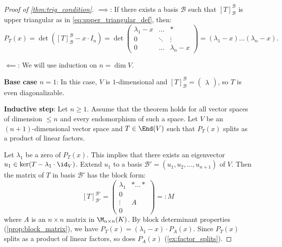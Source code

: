\begin{proof}[Proof of \cref{thm:trig_condition}]
  $\implies$: If there exists a basis $\mathcal{B}$ such that $[T]_{\mathcal{B}}^{\mathcal{B}}$ is upper triangular as in \eqref{eq:upper_triangular_def}, then:
  \[ P_T(x) = \det([T]_{\mathcal{B}}^{\mathcal{B}} - x \cdot I_n) = \det \begin{pmatrix} \lambda_1 - x & \dots & * \\ 0 & \ddots & \vdots \\ 0 & \dots & \lambda_n - x \end{pmatrix} = (\lambda_1 - x) \dots (\lambda_n - x). \]
  
  \noindent
  $\impliedby$: We will use induction on $n = \dim V$.

  \textbf{Base case $n=1$}: In this case, $V$ is $1$-dimensional and $[T]_{\mathcal{B}}^{\mathcal{B}} = \left(\begin{smallmatrix} \lambda \end{smallmatrix}\right)$, so $T$ is even diagonalizable.

  \textbf{Inductive step}: Let $n \ge 1$. Assume that the theorem holds for all vector spaces of dimension $\le n$ and every endomorphism of such a space.
  Let $V$ be an $(n+1)$-dimensional vector space and $T \in \End(V)$ such that $P_T(x)$ splits as a product of linear factors.

  Let $\lambda_1$ be a zero of $P_T(x)$. This implies that there exists an eigenvector $u_1 \in \ker(T - \lambda_1 \cdot \id_V)$.
  Extend $u_1$ to a basis $\mathcal{B}' = (u_1, u_2, \dots, u_{n+1})$ of $V$.
  Then the matrix of $T$ in basis $\mathcal{B}'$ has the block form:
  \begin{equation} \label{eq:M_block}
    [T]_{\mathcal{B}'}^{\mathcal{B}'} = \left(\begin{array}{c|c} \lambda_1 & * \dots * \\ \hline 0 & \\ \vdots & A \\ 0 & \end{array}\right) =: M
  \end{equation}
  where $A$ is an $n \times n$ matrix in $\M_{n \times n}(K)$.
  By block determinant properties (\cref{prop:block_matrix}), we have $P_T(x) = (\lambda_1 - x) \cdot P_A(x)$.
  Since $P_T(x)$ splits as a product of linear factors, so does $P_A(x)$ (\cref{ex:factor_splits}).


\end{proof}
